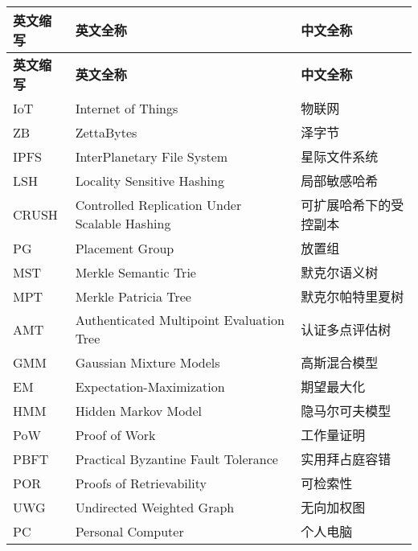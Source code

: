 \cleardoublepage
{}
\begin{center}
    \begin{longtable}{m{2cm}m{8cm}m{5cm}}
        \toprule
        \textbf{英文缩写}&\textbf{英文全称}&\textbf{中文全称}\\
        \midrule
        \endfirsthead
        \toprule
        \textbf{英文缩写}&\textbf{英文全称}&\textbf{中文全称}\\
        \midrule
        \endhead 
        \bottomrule
        \endfoot
        \bottomrule
        \endlastfoot
        IoT&Internet of Things&物联网\\
        ZB&ZettaBytes&泽字节\\
        IPFS&InterPlanetary File System&星际文件系统\\
        LSH&Locality Sensitive Hashing&局部敏感哈希\\
        CRUSH&Controlled Replication Under Scalable Hashing&可扩展哈希下的受控副本\\
        PG&Placement Group&放置组\\
        MST&Merkle Semantic Trie&默克尔语义树\\
        MPT&Merkle Patricia Tree&默克尔帕特里夏树\\
        AMT&Authenticated Multipoint Evaluation Tree&认证多点评估树\\
        GMM&Gaussian Mixture Models&高斯混合模型\\
        EM&Expectation-Maximization&期望最大化\\
        HMM&Hidden Markov Model&隐马尔可夫模型\\
        PoW&Proof of Work&工作量证明\\
        PBFT&Practical Byzantine Fault Tolerance&实用拜占庭容错\\
        POR&Proofs of Retrievability&可检索性\\
        UWG&Undirected Weighted Graph&无向加权图\\
        PC&Personal Computer&个人电脑\\
	\end{longtable}
\end{center}